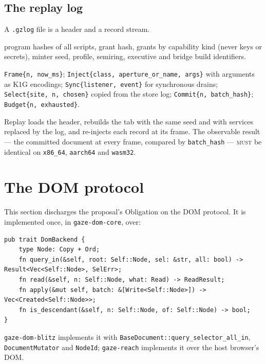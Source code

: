 \documentclass[11pt]{article}
\theoremstyle{definition}
\theoremstyle{remark}
\newcommand{\MUST}{\textsc{must}}
\newcommand{\code}[1]{\texttt{#1}}
\begin{document}
\subsection{The replay log}\label{sec:log}
A \code{.gzlog} file is a header and a record stream.
\begin{description}[nosep,leftmargin=1.5em,style=nextline]
\item[Header] program hashes of all scripts, grant hash, grants by capability kind
  (never keys or secrets), minter seed, profile, semiring, executive and bridge
  build identifiers.
\item[Records] \code{Frame\{n, now\_ms\}}; \code{Inject\{class, aperture\_or\_name,
  args\}} with arguments as K1G encodings; \code{Sync\{listener, event\}} for
  synchronous drains; \code{Select\{site, n, chosen\}} copied from the store log;
  \code{Commit\{n, batch\_hash\}}; \code{Budget\{n, exhausted\}}.
\end{description}
Replay loads the header, rebuilds the tab with the same seed and with services
replaced by the log, and re-injects each record at its frame. The observable result
--- the committed document at every frame, compared by \code{batch\_hash} --- \MUST{}
be identical on \code{x86\_64}, \code{aarch64} and \code{wasm32}.

\section{The DOM protocol}\label{sec:proto}

This section discharges the proposal's Obligation on the DOM protocol. It is
implemented once, in \code{gaze-dom-core}, over:
\begin{lstlisting}[language=RustLite]
pub trait DomBackend {
    type Node: Copy + Ord;
    fn query_in(&self, root: Self::Node, sel: &str, all: bool) -> Result<Vec<Self::Node>, SelErr>;
    fn read(&self, n: Self::Node, what: Read) -> ReadResult;
    fn apply(&mut self, batch: &[Write<Self::Node>]) -> Vec<Created<Self::Node>>;
    fn is_descendant(&self, n: Self::Node, of: Self::Node) -> bool;
}
\end{lstlisting}
\code{gaze-dom-blitz} implements it with \code{BaseDocument::query\_selector\_all\_in},
\code{DocumentMutator} and \code{NodeId}; \code{gaze-reach} implements it over the
host browser's DOM.
\end{document}
